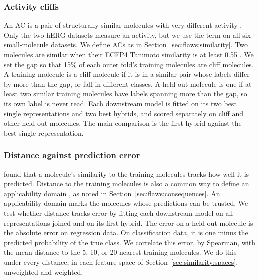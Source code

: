 \subsubsection{Activity cliffs}
An AC is a pair of structurally similar molecules with very different activity \citep{Stumpfe2012,vanTilborg2022}. Only the two hERG datasets measure an activity, but we use the term on all six small-molecule datasets. We define ACs as in Section~\ref{sec:flaws:similarity}. Two molecules are similar when their ECFP4 Tanimoto similarity is at least 0.55 \citep{Hu2015}. We set the gap so that 15\% of each outer fold's training molecules are cliff molecules. A training molecule is a cliff molecule if it is in a similar pair whose labels differ by more than the gap, or fall in different classes. A held-out molecule is one if at least two similar training molecules have labels spanning more than the gap, so its own label is never read. Each downstream model is fitted on its two best single representations and two best hybrids, and scored separately on cliff and other held-out molecules. The main comparison is the first hybrid against the best single representation.

\subsubsection{Distance against prediction error}
\citet{Sheridan2004} found that a molecule's similarity to the training molecules tracks how well it is predicted. Distance to the training molecules is also a common way to define an applicability domain \citep{Tropsha2010}, as noted in Section~\ref{sec:flaws:consequences}. An applicability domain marks the molecules whose predictions can be trusted. We test whether distance tracks error by fitting each downstream model on all representations joined and on its first hybrid. The error on a held-out molecule is the absolute error on regression data. On classification data, it is one minus the predicted probability of the true class. We correlate this error, by Spearman, with the mean distance to the 5, 10, or 20 nearest training molecules. We do this under every distance, in each feature space of Section~\ref{sec:similarity:spaces}, unweighted and weighted.

